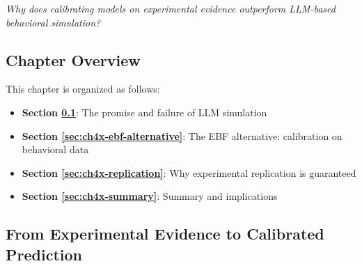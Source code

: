 \begin{tcolorbox}[
    colback=red!5!white,
    colframe=red!75!black,
    title={\textbf{Central Question}},
    fonttitle=\bfseries
]
\Large
\centering
\textit{Why does calibrating models on experimental evidence outperform LLM-based behavioral simulation?}
\end{tcolorbox}

\subsection*{Chapter Overview}

This chapter is organized as follows:

\begin{itemize}
\item \textbf{Section \ref{sec:calibration-vs-simulation}}: The promise and failure of LLM simulation
\item \textbf{Section \ref{sec:ch4x-ebf-alternative}}: The EBF alternative: calibration on behavioral data
\item \textbf{Section \ref{sec:ch4x-replication}}: Why experimental replication is guaranteed
\item \textbf{Section \ref{sec:ch4x-summary}}: Summary and implications
\end{itemize}


\subsection{From Experimental Evidence to Calibrated Prediction}
\label{sec:calibration-vs-simulation}

